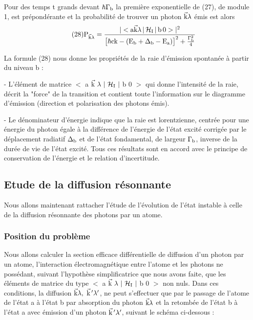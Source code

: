 Pour des temps t grands devant $\hbar\Gamma_{\text{b}}$ la première exponentielle
de (27), de module 1, est prépondérante et la probabilité de trouver un photon
$\vec{\text{k}}\lambda$ émis est alors
\[
\tag{28}\text{P}_{\vec{\text{k}}\lambda}=\frac{|<\text{a}\vec{\text{k}}\lambda\,|\,\mathcal{H}_{\text{I}}\,|\,\text{b}\,0 >|^2}
{\big[\hbar\text{ck}-(\text{E}_{\text{b}}+\Delta_{\text{b}}-\text{E}_{\text{a}})\big]^2+\frac{\Gamma_{\text{b}}^2}{4}}
\]


La formule (28) nous donne les propriétés de la raie d'émission spontanée à partir du niveau b :

- L'élément de matrice $<$ a $\vec{\mt{k}}\ \lambda\ |\ \mc{H}_\mt{I}\ |$ b 0 $>$ qui donne l'intensité de la raie, décrit la "force" de la transition
et contient toute l'information sur le diagramme d'émission (direction et polarisation des photons émis).

- Le dénominateur d'énergie indique que la raie est lorentzienne,
centrée pour une énergie du photon égale à la différence de l'énergie de l'état
excité corrigée par le déplacement radiatif $\Delta_{\text{b}}$ et de l'état fondamental, de
largeur $\Gamma_{\text{b}}$, inverse de la durée de vie de l'état excité. Tous ces résultats sont
en accord avec le principe de conservation de l'énergie et le relation d'incertitude.

\subsection{Etude de la diffusion résonnante}%



Nous allons maintenant rattacher l'étude de l'évolution de l'état
instable à celle de la diffusion résonnante des photons par un atome.
\subsubsection{Position du problème}%

Nous allons calculer la section efficace différentielle de diffusion d'un photon par un atome,
l'interaction électromagnétique entre l'atome
et les photons ne possédant, suivant l'hypothèse simplificatrice que nous avons
faite, que les éléments de matrice du type $<$ a $\vec{\mt{k}}\ \lambda\ |\ \mc{H}_\mt{I}\ |$ b 0 $>$ non nuls.
Dans ces conditions, la diffusion $\vec{\mt{k}}\lambda,\ \vec{\mt{k}}\,'\lambda'$, ne peut s'effectuer que par le
passage de l'atome de l'état a à l'état b par absorption du photon $\vec{\text{k}}\lambda$ et la retombée de
l'état b à l'état a avec émission d'un photon $\vec{\text{k}}\,'\lambda'$, suivant le schéma ci-dessous :
\begin{center}  \end{center}

